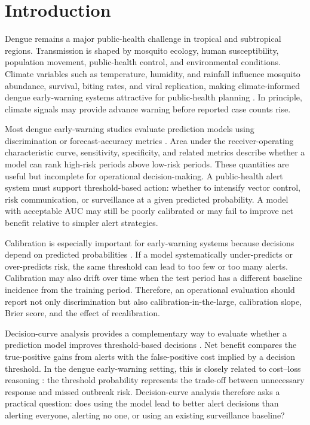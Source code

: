 \documentclass[11pt,a4paper]{article}
\begin{document}
\section{Introduction}
\label{sec:introduction}

Dengue remains a major public-health challenge in tropical and subtropical regions. Transmission is shaped by mosquito ecology, human susceptibility, population movement, public-health control, and environmental conditions. Climate variables such as temperature, humidity, and rainfall influence mosquito abundance, survival, biting rates, and viral replication, making climate-informed dengue early-warning systems attractive for public-health planning \citep{Mordecai2017,Huber2018}. In principle, climate signals may provide advance warning before reported case counts rise.

Most dengue early-warning studies evaluate prediction models using discrimination or forecast-accuracy metrics
\citep{Johansson2019,Baharom2022,HussainAlkhateeb2021}. Area under the receiver-operating characteristic curve, sensitivity, specificity, and related metrics describe whether a model can rank high-risk periods above low-risk periods. These quantities are useful but incomplete for operational decision-making. A public-health alert system must support threshold-based action: whether to intensify vector control, risk communication, or surveillance at a given predicted probability. A model with acceptable AUC may still be poorly calibrated or may fail to improve net benefit relative to simpler alert strategies.

Calibration is especially important for early-warning systems because decisions depend on predicted probabilities
\citep{VanCalster2019,VanCalster2023}. If a model systematically under-predicts or over-predicts risk, the same threshold can lead to too few or too many alerts. Calibration may also drift over time when the test period has a different baseline incidence from the training period. Therefore, an operational evaluation should report not only discrimination but also calibration-in-the-large, calibration slope, Brier score, and the effect of recalibration.

Decision-curve analysis provides a complementary way to evaluate whether a prediction model improves threshold-based decisions
\citep{Vickers2006}. Net benefit compares the true-positive gains from alerts with the false-positive cost implied by a decision threshold. In the dengue early-warning setting, this is closely related to cost--loss reasoning \citep{Murphy1985,Tozan2023}: the threshold probability represents the trade-off between unnecessary response and missed outbreak risk. Decision-curve analysis therefore asks a practical question: does using the model lead to better alert decisions than alerting everyone, alerting no one, or using an existing surveillance baseline?
\end{document}
